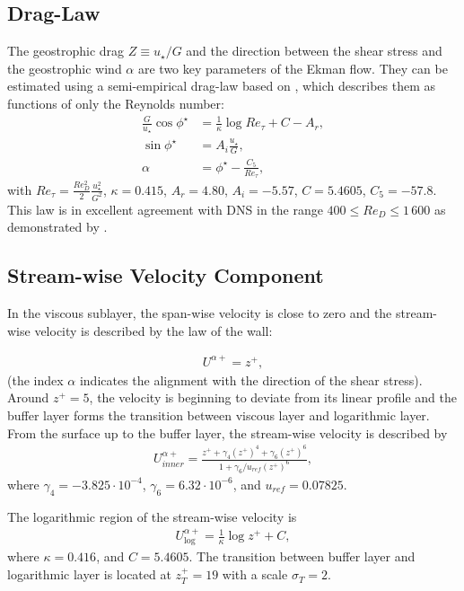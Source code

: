 \documentclass[a4paper,11pt]{article}
\begin{document}
\subsection{Drag-Law}

The geostrophic drag $Z \equiv u_\star/G$ and the direction between the shear stress and the geostrophic wind $\alpha$ are two key parameters of the Ekman flow. They can be estimated using a semi-empirical drag-law based on \cite{spalart1989theoretical}, which describes them as functions of only the Reynolds number:
\begin{subequations}\label{drag}
	\begin{align}
		\frac{G}{u_\star}\cos\phi^\star &= \frac{1}{\kappa}\log Re_\tau + C - A_r, \\
		\sin\phi^\star &= A_i\frac{u_\star}{G},\\
		\alpha &= \phi^\star - \frac{C_5}{Re_\tau},
	\end{align}
\end{subequations}
with $Re_\tau = \frac{Re_D^2}{2}\frac{u_\star^2}{G^2}$, $\kappa = 0.415$, $A_r = 4.80$, $A_i = -5.57$, $C = 5.4605$, $C_5 = -57.8$. This law is in excellent agreement with DNS in the range $400\leq Re_D\leq 1\,600$ as demonstrated by \cite{ansorge2014global}.

\subsection{Stream-wise Velocity Component}

In the viscous sublayer, the span-wise velocity is close to zero and the stream-wise velocity is described by the law of the wall:

\begin{align}
  U^{\alpha+} = z^+,
\end{align}
(the index $\alpha$ indicates the alignment with the direction of the shear stress). Around $z^+=5$, the velocity is beginning to deviate from its linear profile and the buffer layer forms the transition between viscous layer and logarithmic layer. From the surface up to the buffer layer, the stream-wise velocity is described by
\begin{align}
  U_{inner}^{\alpha+} = \frac{z^+ + \gamma_4(z^+)^4 + \gamma_6(z^+)^6}{1+\gamma_6/u_{ref}(z^+)^6},
\end{align}
where $\gamma_4=-3.825\cdot10^{-4}$, $\gamma_6=6.32\cdot10^{-6}$, and $u_{ref}=0.07825$.

The logarithmic region of the stream-wise velocity is 
\begin{align}
  U_{\log}^{\alpha+} = \frac{1}{\kappa}\log z^+ + C,
\end{align}
where $\kappa=0.416$, and $C=5.4605$. The transition between buffer layer and logarithmic layer is located at $z_T^+=19$ with a scale $\sigma_T=2$.
\end{document}
